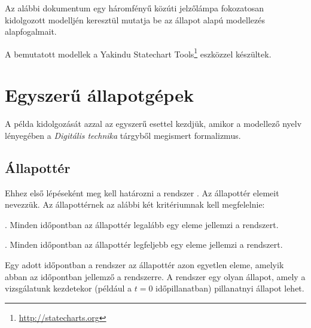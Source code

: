 \label{sec:allapot-alapu-modellezes}

\graphicspath{ {./allapot-alapu-modellezes/figures/} }

\newcommand{\allapotgepsmallscale}{0.45}
\newcommand{\allapotgepmediumscale}{0.53}
\newcommand{\allapotgeplargescale}{0.6}

\newenvironment{fektetett}{\begin{landscape}\vspace*{\fill}}{\vspace*{\fill}\end{landscape}}

Az alábbi dokumentum egy háromfényű közúti jelzőlámpa fokozatosan kidolgozott modelljén keresztül mutatja be az állapot alapú modellezés alapfogalmait.

A bemutatott modellek a Yakindu Statechart Tools\footnote{\url{http://statecharts.org}} eszközzel készültek.

\section{Egyszerű állapotgépek}

A példa kidolgozását azzal az egyszerű esettel kezdjük, amikor a modellező nyelv lényegében a \emph{Digitális technika} tárgyből megismert  formalizmus.

\subsection{Állapottér}

Ehhez első lépéseként meg kell határozni a rendszer . Az állapottér elemeit  nevezzük. Az állapottérnek az alábbi két kritériumnak kell megfelelnie: 

\begin{definicio}
. Minden időpontban az állapottér legalább egy eleme jellemzi a rendszert.
\end{definicio}

\begin{definicio}
. Minden időpontban az állapottér legfeljebb egy eleme jellemzi a rendszert.
\end{definicio}

Egy adott időpontban a rendszer  az állapottér azon egyetlen eleme, amelyik abban az időpontban jellemző a rendszerre. A rendszer egy  olyan állapot, amely a vizsgálatunk kezdetekor (például a $t = 0$ időpillanatban) pillanatnyi állapot lehet.

